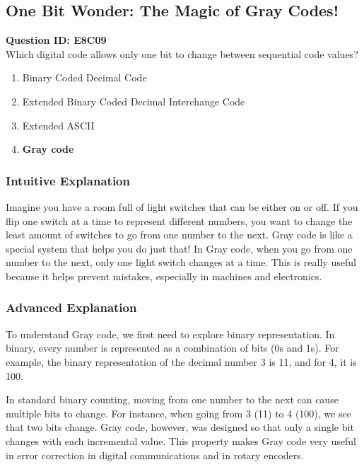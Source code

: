 \subsection{One Bit Wonder: The Magic of Gray Codes!}

\begin{tcolorbox}[colback=blue!5!white, colframe=blue!75!black, title=Question E8C09]
    \textbf{Question ID: E8C09} \\
    Which digital code allows only one bit to change between sequential code values?
    \begin{enumerate}[label=\Alph*.]
        \item Binary Coded Decimal Code
        \item Extended Binary Coded Decimal Interchange Code
        \item Extended ASCII
        \item \textbf{Gray code}
    \end{enumerate}
\end{tcolorbox}

\subsubsection{Intuitive Explanation}
Imagine you have a room full of light switches that can be either on or off. If you flip one switch at a time to represent different numbers, you want to change the least amount of switches to go from one number to the next. Gray code is like a special system that helps you do just that! In Gray code, when you go from one number to the next, only one light switch changes at a time. This is really useful because it helps prevent mistakes, especially in machines and electronics.

\subsubsection{Advanced Explanation}
To understand Gray code, we first need to explore binary representation. In binary, every number is represented as a combination of bits (0s and 1s). For example, the binary representation of the decimal number 3 is 11, and for 4, it is 100. 

In standard binary counting, moving from one number to the next can cause multiple bits to change. For instance, when going from 3 (11) to 4 (100), we see that two bits change. Gray code, however, was designed so that only a single bit changes with each incremental value. This property makes Gray code very useful in error correction in digital communications and in rotary encoders.

